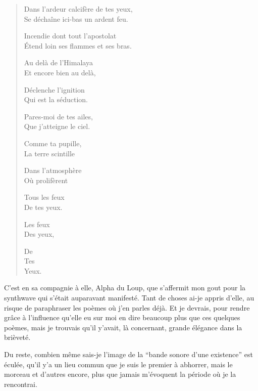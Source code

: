 \begin{verse}
Dans l’ardeur calcifère de tes yeux,\\
Se déchaîne ici-bas un ardent feu.

Incendie dont tout l’apostolat\\
Étend loin ses flammes et ses bras.

Au delà de l’Himalaya\\
Et encore bien au delà,

Déclenche l’ignition\\
Qui est la séduction.

Pares-moi de tes ailes,\\
Que j’atteigne le ciel.

Comme ta pupille,\\
La terre scintille

Dans l’atmosphère\\
Où  prolifèrent

Tous les feux\\
De tes yeux.

Les feux\\
Des yeux,

De\\
Tes\\
Yeux.
\end{verse}

\begin{prose}
C’est en sa compagnie à elle, Alpha du Loup, que s’affermit mon gout pour la synthwave qui s’était auparavant manifesté. Tant de choses ai-je appris d’elle, au risque de paraphraser les poèmes où j’en parles déjà.
Et je devrais, pour rendre grâce à l’influence  qu’elle eu sur moi en dire beaucoup plus que ces quelques poèmes, mais je trouvais qu’il y’avait, là concernant, grande élégance dans la brièveté.
\end{prose}

\begin{prose}
Du reste, combien même sais-je l’image de la \enquote{bande sonore d’une existence} est éculée, qu’il y’a un lieu commun que je suis le premier à abhorrer, mais le morceau  et d’autres encore, plus que jamais m’évoquent la période où je la rencontrai.
\end{prose}

